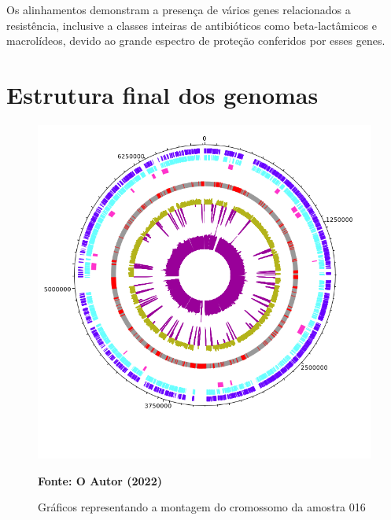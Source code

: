 Os alinhamentos demonstram a presença de vários genes relacionados a resistência, inclusive a classes inteiras de antibióticos 
como beta-lactâmicos e macrolídeos, devido ao grande espectro de proteção conferidos por esses genes. 

\section{Estrutura final dos genomas}

\begin{figure}[H]
	\caption{Gráficos representando a montagem do cromossomo da amostra 016}
	\label{fig:genoma16}
	\centering
	\includegraphics[width=0.8\linewidth]{imagens/genome/002.png} \\
	\centering
    \begin{small}\textbf{Fonte: O Autor (2022)}\end{small}
\end{figure}
\vspace{\floatsep}


